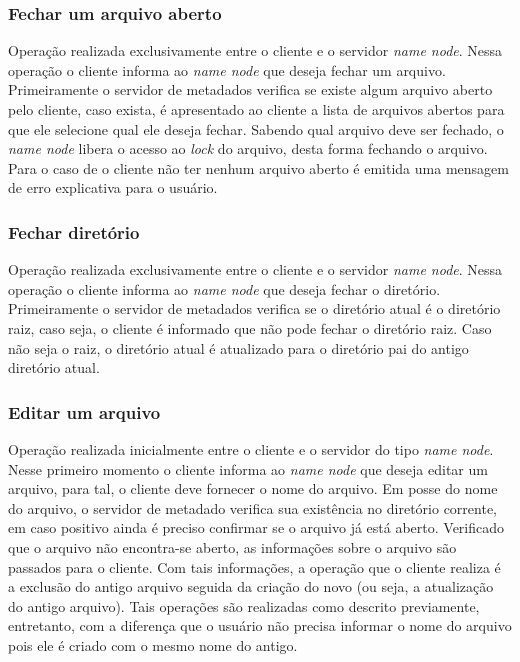 \subsubsection{Fechar um arquivo aberto}

Operação realizada exclusivamente entre o cliente e o servidor \textit{name node}. Nessa operação o cliente informa ao \textit{name node} que deseja fechar um arquivo. Primeiramente o servidor de metadados verifica se existe algum arquivo aberto pelo cliente, caso exista, é apresentado ao cliente a lista de arquivos abertos para que ele selecione qual ele deseja fechar. Sabendo qual arquivo deve ser fechado, o \textit{name node} libera o acesso ao \textit{lock} do arquivo, desta forma fechando o arquivo. Para o caso de o cliente não ter nenhum arquivo aberto é emitida uma mensagem de erro explicativa para o usuário.
\\

\subsubsection{Fechar diretório}

Operação realizada exclusivamente entre o cliente e o servidor \textit{name node}. Nessa operação o cliente informa ao \textit{name node} que deseja fechar o diretório. Primeiramente o servidor de metadados verifica se o diretório atual é o diretório raiz, caso seja, o cliente é informado que não pode fechar o diretório raiz. Caso não seja o raiz, o diretório atual é atualizado para o diretório pai do antigo diretório atual.
\\

\subsubsection{Editar um arquivo}

Operação realizada inicialmente entre o cliente e o servidor do tipo \textit{name node}. Nesse primeiro momento o cliente informa ao \textit{name node} que deseja editar um arquivo, para tal, o cliente deve fornecer o nome do arquivo. Em posse do nome do arquivo, o servidor de metadado verifica sua existência no diretório corrente, em caso positivo ainda é preciso confirmar se o arquivo já está aberto. Verificado que o arquivo não encontra-se aberto, as informações sobre o arquivo são passados para o cliente. Com tais informações, a operação que o cliente realiza é a exclusão do antigo arquivo seguida da criação do novo (ou seja, a atualização do antigo arquivo). Tais operações são realizadas como descrito previamente, entretanto, com a diferença que o usuário não precisa informar o nome do arquivo pois ele é criado com o mesmo nome do antigo.
\\

